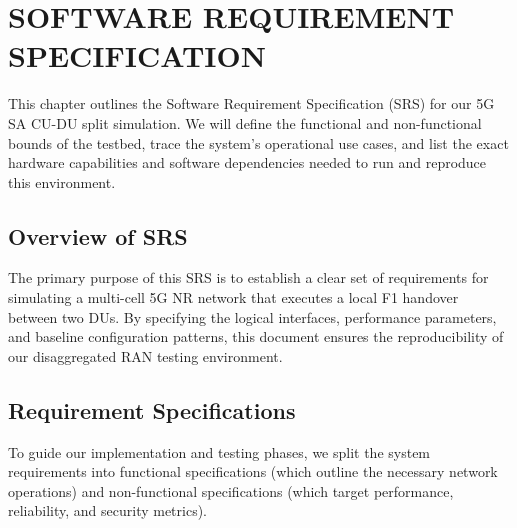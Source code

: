 \chapter{SOFTWARE REQUIREMENT SPECIFICATION}

\justify
This chapter outlines the Software Requirement Specification (SRS) for our 5G SA CU-DU split simulation. We will define the functional and non-functional bounds of the testbed, trace the system's operational use cases, and list the exact hardware capabilities and software dependencies needed to run and reproduce this environment.

\section{Overview of SRS}
\justify
The primary purpose of this SRS is to establish a clear set of requirements for simulating a multi-cell 5G NR network that executes a local F1 handover between two DUs. By specifying the logical interfaces, performance parameters, and baseline configuration patterns, this document ensures the reproducibility of our disaggregated RAN testing environment.

\section{Requirement Specifications}
\justify
To guide our implementation and testing phases, we split the system requirements into functional specifications (which outline the necessary network operations) and non-functional specifications (which target performance, reliability, and security metrics).

